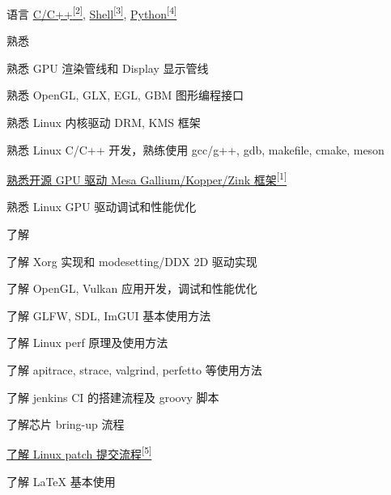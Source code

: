 
\begin{cvskills}
  \cvskill
    {语言} %
    {\hyperlink{cpp-proj}{C/C++\textsuperscript{[2]}}, \hyperlink{shell-proj}{Shell\textsuperscript{[3]}}, \hyperlink{python-proj}{Python\textsuperscript{[4]}}} %
\end{cvskills}

\begin{cventries}
  \cventry
    {} %
    {熟悉} %
    {} %
    {} %
    {
      \begin{cvitems} %
        \item {熟悉 GPU 渲染管线和 Display 显示管线}
        \item {熟悉 OpenGL, GLX, EGL, GBM 图形编程接口}
        \item {熟悉 Linux 内核驱动 DRM, KMS 框架}
        \item {熟悉 Linux C/C++ 开发，熟练使用 gcc/g++, gdb, makefile, cmake, meson}
        \item {\hyperlink{mesa-mr}{熟悉开源 GPU 驱动 Mesa Gallium/Kopper/Zink 框架\textsuperscript{[1]}}}
        \item {熟悉 Linux GPU 驱动调试和性能优化}
      \end{cvitems}
    }
  \cventry
    {} %
    {了解} %
    {} %
    {} %
    {
      \begin{cvitems} %
        \item {了解 Xorg 实现和 modesetting/DDX 2D 驱动实现}
        \item {了解 OpenGL, Vulkan 应用开发，调试和性能优化}
        \item {了解 GLFW, SDL, ImGUI 基本使用方法}
        \item {了解 Linux perf 原理及使用方法}
        \item {了解 apitrace, strace, valgrind, perfetto 等使用方法}
        \item {了解 jenkins CI 的搭建流程及 groovy 脚本}
        \item {了解芯片 bring-up 流程}
        \item {\hyperlink{linux-patches}{了解 Linux patch 提交流程\textsuperscript{[5]}}}
        \item {了解 LaTeX 基本使用}
      \end{cvitems}
    }
\end{cventries}
